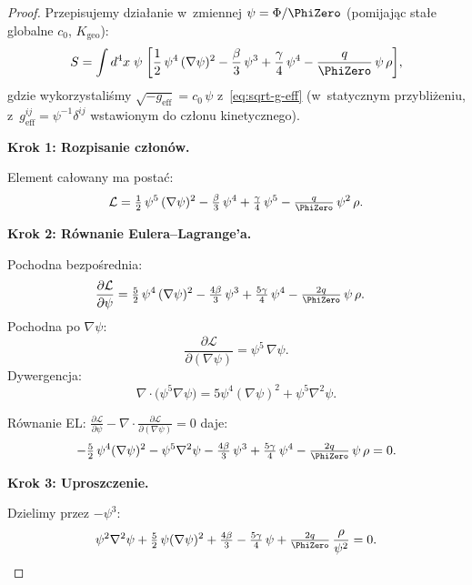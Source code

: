 \begin{proof}
Przepisujemy dzia\l{}anie w~zmiennej $\psi = \Phi/\PhiZero$
(pomijaj\k{a}c sta\l{}e globalne $c_0$, $K_{\mathrm{geo}}$):
\begin{equation}\label{eq:S-unified-psi}
  S = \int d^4x\;\psi\;\biggl[
    \frac{1}{2}\,\psi^4\,(\nabla\psi)^2
    - \frac{\beta}{3}\,\psi^3 + \frac{\gamma}{4}\,\psi^4
    - \frac{q}{\PhiZero}\,\psi\,\rho
  \biggr],
\end{equation}
gdzie wykorzystali\'smy $\sqrt{-g_{\mathrm{eff}}} = c_0\,\psi$
z~\eqref{eq:sqrt-g-eff} (w~statycznym przybli\.zeniu,
z~$g_{\mathrm{eff}}^{ij} = \psi^{-1}\delta^{ij}$
wstawionym do cz\l{}onu kinetycznego).

\medskip\noindent\textbf{Krok 1: Rozpisanie cz\l{}on\'ow.}

Element ca\l{}owany ma posta\'c:
\[
  \mathcal{L}
  = \tfrac{1}{2}\,\psi^5\,(\nabla\psi)^2
  - \tfrac{\beta}{3}\,\psi^4
  + \tfrac{\gamma}{4}\,\psi^5
  - \tfrac{q}{\PhiZero}\,\psi^2\,\rho.
\]

\medskip\noindent\textbf{Krok 2: R\'ownanie Eulera--Lagrange'a.}

Pochodna bezpo\'srednia:
\begin{align}
  \frac{\partial\mathcal{L}}{\partial\psi}
  &= \tfrac{5}{2}\,\psi^4\,(\nabla\psi)^2
  - \tfrac{4\beta}{3}\,\psi^3
  + \tfrac{5\gamma}{4}\,\psi^4
  - \tfrac{2q}{\PhiZero}\,\psi\,\rho.
\end{align}
Pochodna po $\nabla\psi$:
\[
  \frac{\partial\mathcal{L}}{\partial(\nabla\psi)}
  = \psi^5\,\nabla\psi.
\]
Dywergencja:
\[
  \nabla\!\cdot\!\bigl(\psi^5\nabla\psi\bigr)
  = 5\psi^4(\nabla\psi)^2 + \psi^5\nabla^2\psi.
\]

R\'ownanie EL:
$\frac{\partial\mathcal{L}}{\partial\psi}
- \nabla\!\cdot\!\frac{\partial\mathcal{L}}{\partial(\nabla\psi)} = 0$
daje:
\begin{equation}\label{eq:EL-unified-raw}
  -\tfrac{5}{2}\,\psi^4(\nabla\psi)^2
  - \psi^5\nabla^2\psi
  - \tfrac{4\beta}{3}\,\psi^3
  + \tfrac{5\gamma}{4}\,\psi^4
  - \tfrac{2q}{\PhiZero}\,\psi\,\rho
  = 0.
\end{equation}

\medskip\noindent\textbf{Krok 3: Uproszczenie.}

Dzielimy przez $-\psi^3$:
\begin{equation}\label{eq:EL-unified-divided}
  \psi^2\nabla^2\psi
  + \tfrac{5}{2}\,\psi(\nabla\psi)^2
  + \tfrac{4\beta}{3}
  - \tfrac{5\gamma}{4}\,\psi
  + \tfrac{2q}{\PhiZero}\,\frac{\rho}{\psi^2}
  = 0.
\end{equation}


\end{proof}
